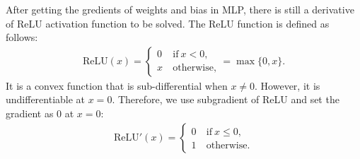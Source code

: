 \documentclass{article}
\begin{document}
After getting the gredients of weights and bias in MLP, there is still a derivative of ReLU activation function to be solved. The ReLU function is defined as follows:
\begin{align}
    \text{ReLU}\left(x\right) = \begin{cases}
        0 &~\text{if}~x < 0, \\
        x &~\text{otherwise},
    \end{cases} = \max\{0, x\}.
\end{align}
It is a convex function that is sub-differential when $x \ne 0$. However, it is undifferentiable at $x = 0$. Therefore, we use subgradient of ReLU and set the gradient as 0 at $x = 0$:
\begin{align}
    \text{ReLU}'\left(x\right) = \begin{cases}
        0 &~\text{if}~x \le 0, \\
        1 &~\text{otherwise}.
    \end{cases}
\end{align}
\end{document}
